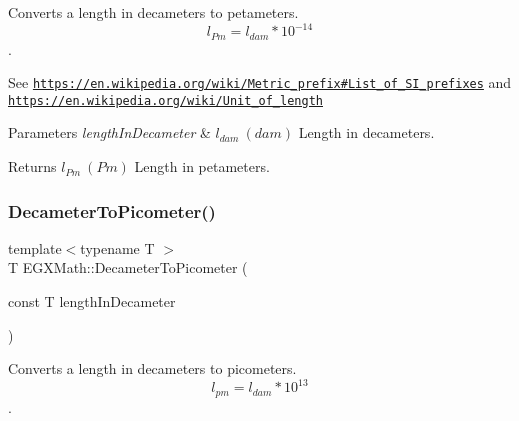 Converts a length in decameters to petameters. \[ l_{Pm}=l_{dam} * 10^{-14} \]. 

See \href{https://en.wikipedia.org/wiki/Metric_prefix#List_of_SI_prefixes}{\tt https\+://en.\+wikipedia.\+org/wiki/\+Metric\+\_\+prefix\#\+List\+\_\+of\+\_\+\+S\+I\+\_\+prefixes} and \href{https://en.wikipedia.org/wiki/Unit_of_length}{\tt https\+://en.\+wikipedia.\+org/wiki/\+Unit\+\_\+of\+\_\+length} 
\begin{DoxyParams}{Parameters}
{\em length\+In\+Decameter} & $ l_{dam}\ (dam)$ Length in decameters. \\
\hline
\end{DoxyParams}
\begin{DoxyReturn}{Returns}
$ l_{Pm}\ (Pm)$ Length in petameters. 
\end{DoxyReturn}
\mbox{\label{group___e_g_x_math-_conversions-_length_conversions-_s_i-_decameter-_s_i_gab265bbced03f7b08cf4ad0db29da6dfd}} 
\subsubsection{\texorpdfstring{Decameter\+To\+Picometer()}{DecameterToPicometer()}}
{\footnotesize\ttfamily template$<$typename T $>$ \\
T E\+G\+X\+Math\+::\+Decameter\+To\+Picometer (\begin{DoxyParamCaption}\item[{const T}]{length\+In\+Decameter }\end{DoxyParamCaption})}



Converts a length in decameters to picometers. \[ l_{pm}=l_{dam} * 10^{13} \]. 

